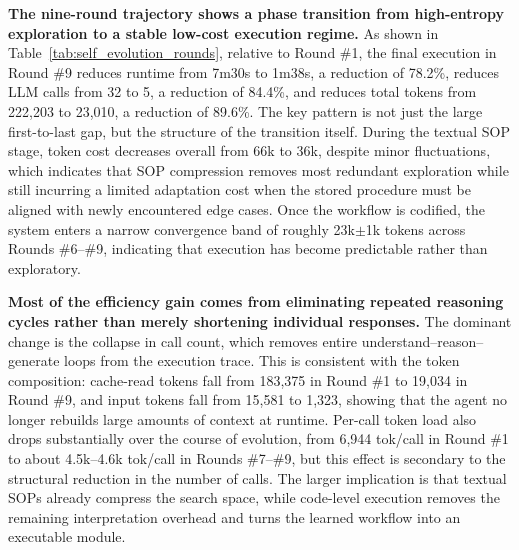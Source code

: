 \textbf{The nine-round trajectory shows a phase transition from high-entropy exploration to a stable low-cost execution regime.} 
As shown in Table~\ref{tab:self_evolution_rounds}, relative to Round \#1, the final execution in Round \#9 reduces runtime from 7m30s to 1m38s, a reduction of 78.2\%, reduces LLM calls from 32 to 5, a reduction of 84.4\%, and reduces total tokens from 222,203 to 23,010, a reduction of 89.6\%. 
The key pattern is not just the large first-to-last gap, but the structure of the transition itself. 
During the textual SOP stage, token cost decreases overall from 66k to 36k, despite minor fluctuations, which indicates that SOP compression removes most redundant exploration while still incurring a limited adaptation cost when the stored procedure must be aligned with newly encountered edge cases.
Once the workflow is codified, the system enters a narrow convergence band of roughly 23k$\pm$1k tokens across Rounds \#6--\#9, indicating that execution has become predictable rather than exploratory.

\textbf{Most of the efficiency gain comes from eliminating repeated reasoning cycles rather than merely shortening individual responses.} The dominant change is the collapse in call count, which removes entire understand--reason--generate loops from the execution trace. This is consistent with the token composition: cache-read tokens fall from 183,375 in Round \#1 to 19,034 in Round \#9, and input tokens fall from 15,581 to 1,323, showing that the agent no longer rebuilds large amounts of context at runtime. Per-call token load also drops substantially over the course of evolution, from 6,944 tok/call in Round \#1 to about 4.5k--4.6k tok/call in Rounds \#7--\#9, but this effect is secondary to the structural reduction in the number of calls. The larger implication is that textual SOPs already compress the search space, while code-level execution removes the remaining interpretation overhead and turns the learned workflow into an executable module.


